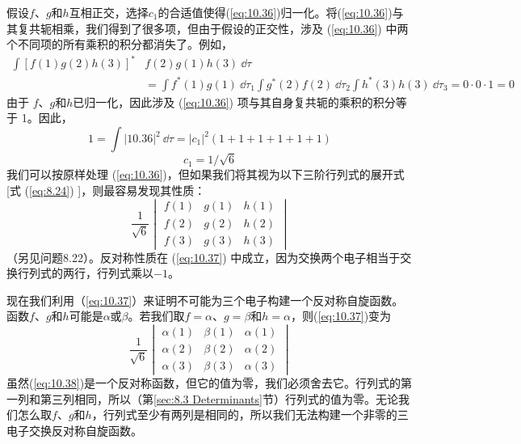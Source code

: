     假设$f$、$g$和$h$互相正交，选择$c_1$的合适值使得(\ref{eq:10.36})归一化。将(\ref{eq:10.36})与其复共轭相乘，我们得到了很多项，但由于假设的正交性，涉及 (\ref{eq:10.36}) 中两个不同项的所有乘积的积分都消失了。例如，
    \begin{equation*}
        \begin{aligned}
            \int \left[f\left(1\right)g\left(2\right)h\left(3\right)\right]^*&f\left(2\right)g\left(1\right)h\left(3\right) \:\dd \tau \\
            &= \int f^*\left(1\right)g\left(1\right)\:\dd \tau_1 \int g^*\left(2\right)f\left(2\right)\:\dd \tau_2 \int h^*\left(3\right)h\left(3\right)\:\dd \tau_3 = 0 \cdot 0 \cdot 1 = 0
        \end{aligned}
    \end{equation*}
    由于 $f$、$g$和$h$已归一化，因此涉及 (\ref{eq:10.36}) 项与其自身复共轭的乘积的积分等于 1。因此，
    \begin{equation*}
        1 = \int \left|10.36\right|^2 \:\dd \tau = \left|c_1\right|^2 \left(1+1+1+1+1+1\right)
    \end{equation*}
    \begin{equation*}
        c_1 = 1 / \sqrt{6}
    \end{equation*}
    我们可以按原样处理 (\ref{eq:10.36})，但如果我们将其视为以下三阶行列式的展开式 [式 (\ref{eq:8.24}) ]，则最容易发现其性质：
    \begin{equation}
        \boxed{ 
            \frac{1}{\sqrt{6}}\begin{vmatrix}
                f\left(1\right) & g\left(1\right) & h\left(1\right) \\
                f\left(2\right) & g\left(2\right) & h\left(2\right) \\
                f\left(3\right) & g\left(3\right) & h\left(3\right)
            \end{vmatrix}
        }
        \label{eq:10.37}
    \end{equation}
    （另见问题8.22）。反对称性质在 (\ref{eq:10.37}) 中成立，因为交换两个电子相当于交换行列式的两行，行列式乘以$-1$。

    现在我们利用（\ref{eq:10.37}）来证明不可能为三个电子构建一个反对称自旋函数。函数$f$、$g$和$h$可能是$\alpha$或$\beta$。若我们取$f = \alpha$、$g = \beta$和$h = \alpha$，则(\ref{eq:10.37})变为
    \begin{equation}
        \frac{1}{\sqrt{6}}\begin{vmatrix}
            \alpha\left(1\right) & \beta\left(1\right) & \alpha\left(1\right) \\
            \alpha\left(2\right) & \beta\left(2\right) & \alpha\left(2\right) \\
            \alpha\left(3\right) & \beta\left(3\right) & \alpha\left(3\right)
        \end{vmatrix}
        \label{eq:10.38}
    \end{equation}
    虽然(\ref{eq:10.38})是一个反对称函数，但它的值为零，我们必须舍去它。行列式的第一列和第三列相同，所以（第\ref{sec:8.3 Determinants}节）行列式的值为零。无论我们怎么取$f$、$g$和$h$，行列式至少有两列是相同的，所以我们无法构建一个非零的三电子交换反对称自旋函数。

